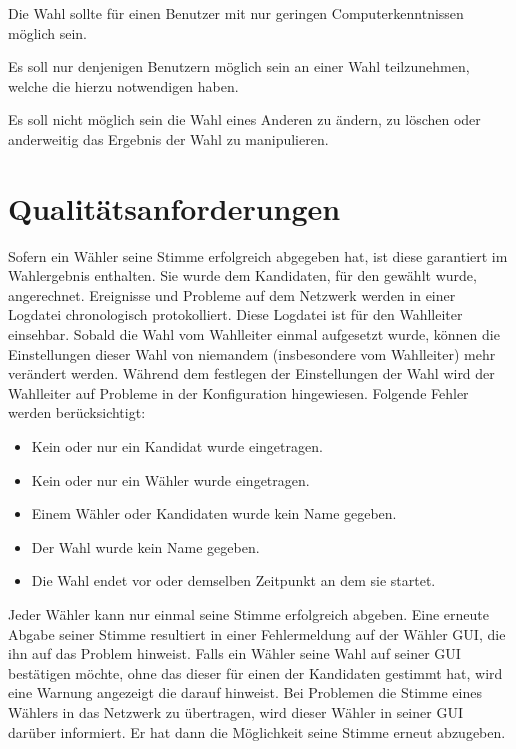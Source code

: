 \documentclass[parskip=full,11pt,twoside]{scrartcl}
\begin{document}
Die \gls{Wahl} sollte für einen \gls{Benutzer} mit nur geringen Computerkenntnissen möglich sein.

Es soll nur denjenigen Benutzern möglich sein an einer \gls{Wahl} teilzunehmen, welche die hierzu notwendigen  haben.

Es soll nicht möglich sein die \gls{Wahl} eines Anderen zu ändern,  zu löschen oder anderweitig das Ergebnis der \gls{Wahl} zu manipulieren.

\section{Qualitätsanforderungen}
Sofern ein Wähler seine Stimme erfolgreich abgegeben hat, ist diese garantiert im Wahlergebnis enthalten. Sie wurde dem Kandidaten, für den gewählt wurde, angerechnet.
Ereignisse und Probleme auf dem \gls{Netzwerk} werden in einer \gls{Logdatei} chronologisch protokolliert. Diese \gls{Logdatei} ist für den \gls{Wahlleiter} einsehbar.
Sobald die Wahl vom \gls{Wahlleiter} einmal aufgesetzt wurde, können die Einstellungen dieser Wahl von niemandem (insbesondere vom \gls{Wahlleiter}) mehr verändert werden.
Während dem festlegen der Einstellungen der Wahl wird der \gls{Wahlleiter} auf Probleme in der \gls{Konfiguration} hingewiesen. Folgende Fehler werden berücksichtigt:
	\begin{itemize}
		\item Kein oder nur ein Kandidat wurde eingetragen.
		\item Kein oder nur ein Wähler wurde eingetragen.
		\item Einem Wähler oder Kandidaten wurde kein Name gegeben.
		\item Der Wahl wurde kein Name gegeben.
		\item Die Wahl endet vor oder demselben Zeitpunkt an dem sie startet.
	\end{itemize}
Jeder Wähler kann nur einmal seine Stimme erfolgreich abgeben. Eine erneute Abgabe seiner Stimme resultiert in einer Fehlermeldung auf der Wähler GUI, die ihn auf das Problem hinweist.
Falls ein Wähler seine Wahl auf seiner GUI bestätigen möchte, ohne das dieser für einen der Kandidaten gestimmt hat, wird eine Warnung angezeigt die darauf hinweist.
Bei Problemen die Stimme eines Wählers in das \gls{Netzwerk} zu übertragen, wird dieser Wähler in seiner GUI darüber informiert. Er hat dann die Möglichkeit seine Stimme erneut abzugeben. 
\end{document}
